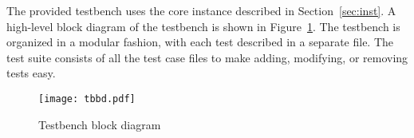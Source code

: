 The provided testbench uses the core instance described in
Section~\ref{sec:inst}. A high-level block diagram of the testbench is shown in
Figure~\ref{fig:tbbd}. The testbench is organized in a modular fashion, with
each test described in a separate file. The test suite consists of all the test
case files to make adding, modifying, or removing tests easy.

\begin{figure}[!htbp]
    \centerline{\texttt{[image: tbbd.pdf]}}
    \vspace{0cm}\caption{Testbench block diagram}
    \label{fig:tbbd}
\end{figure}


